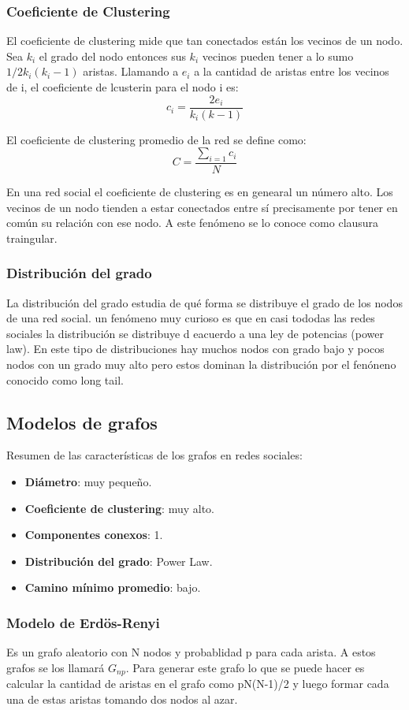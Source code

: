 \documentclass[titlepage,a4paper]{article}
\begin{document}
\subsubsection*{Coeficiente de Clustering}
El coeficiente de clustering mide que tan conectados están los vecinos de un nodo. Sea $k_i$ el grado del nodo entonces sus $k_i$ vecinos pueden tener a lo sumo $1/2k_i(k_i-1)$ aristas. Llamando a $e_i$ a la cantidad de aristas entre los vecinos de i, el coeficiente de lcusterin para el nodo i es: $$c_i = \frac{2e_i}{k_i(k-1)} $$

El coeficiente de clustering promedio de la red se define como: $$C =\frac{\sum_{i=1} c_i}{N}$$

En una red social el coeficiente de clustering es en genearal un número alto. Los vecinos de un nodo tienden a estar conectados entre sí precisamente por tener en común su relación con ese nodo. A este fenómeno se lo conoce como clausura traingular. 

\subsubsection*{Distribución del grado}
La distribución del grado estudia de qué forma se distribuye el grado de los nodos de una red social. un fenómeno muy curioso es que en casi tododas las redes sociales la distribución se distribuye d eacuerdo a una ley de potencias (power law). En este tipo de distribuciones hay muchos nodos con grado bajo y pocos nodos con un grado muy alto pero estos dominan la distribución por el fenóneno conocido como long tail. 

\subsection*{Modelos de grafos}
Resumen de las características de los grafos en redes sociales: 
\begin{itemize}
\item \textbf{Diámetro}: muy pequeño. 
\item\textbf{ Coeficiente de clustering}: muy alto. 
\item\textbf{ Componentes conexos}: 1.
\item\textbf{ Distribución del grado}: Power Law. 
\item \textbf{Camino mínimo promedio}: bajo. 
\end{itemize}

\subsubsection*{Modelo de Erdös-Renyi}
Es un grafo aleatorio con N nodos y probablidad p para cada arista. A estos grafos se los llamará $G_{np}$. Para generar este grafo lo que se puede hacer es calcular la cantidad de aristas en el grafo como pN(N-1)/2 y luego formar cada una de estas aristas tomando dos nodos al azar. \\
\end{document}
